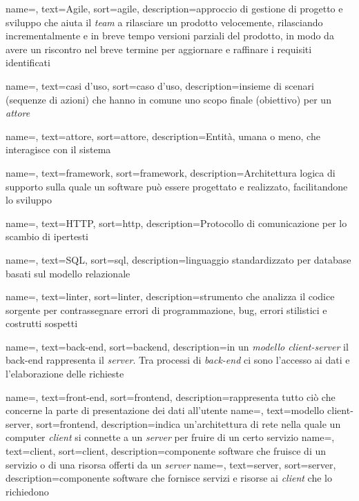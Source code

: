 {
    name=,
    text=Agile,
    sort=agile,
    description={approccio di gestione di progetto e sviluppo che aiuta il \textit{team} a rilasciare un prodotto velocemente, rilasciando incrementalmente e in breve tempo versioni parziali del prodotto, in modo da avere un riscontro nel breve termine per aggiornare e raffinare i requisiti identificati}
}

{
    name=,
    text=casi d'uso,
    sort=caso d'uso,
    description={insieme di scenari (sequenze di azioni) che hanno in comune uno scopo finale (obiettivo) per un \textit{attore}}
}

{
    name=,
    text=attore,
    sort=attore,
    description={Entità, umana o meno, che interagisce con il sistema}
}

{
    name=,
    text=framework,
    sort=framework,
    description={Architettura logica di supporto sulla quale un software può essere progettato e realizzato, facilitandone lo sviluppo}
}

{
    name=,
    text=HTTP,
    sort=http,
    description={Protocollo di comunicazione per lo scambio di ipertesti}
}

{
    name=,
    text=SQL,
    sort=sql,
    description={linguaggio standardizzato per database basati sul modello relazionale}
}

{
    name=,
    text=linter,
    sort=linter,
    description={strumento che analizza il codice sorgente per contrassegnare errori di programmazione, bug, errori stilistici e costrutti sospetti}
}

{
    name=,
    text=back-end,
    sort=backend,
    description={in un \textit{modello client-server} il back-end rappresenta il \textit{server}. Tra processi di \textit{back-end} ci sono l'accesso ai dati e l'elaborazione delle richieste}
}

{
    name=,
    text=front-end,
    sort=frontend,
    description={rappresenta tutto ciò che concerne la parte di presentazione dei dati all'utente}
}
{
    name=,
    text=modello client-server,
    sort=frontend,
    description={indica un'architettura di rete nella quale un computer \textit{client} si connette a un \textit{server} per fruire di un certo servizio}
}
{
    name=,
    text=client,
    sort=client,
    description={componente software che fruisce di un servizio o di una risorsa offerti da un \textit{server}}
}
{
    name=,
    text=server,
    sort=server,
    description={componente software che fornisce servizi e risorse ai \textit{client} che lo richiedono}
}

